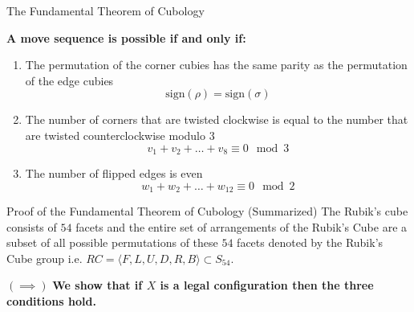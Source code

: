\documentclass[final]{beamer}
\newlength{\colwidth}
\begin{document}
\begin{frame}[t]
\begin{columns}[t]
\begin{column}{\colwidth}

  \begin{alertblock}{The Fundamental Theorem of Cubology}
    
    \textbf{A move sequence is possible if and only if:} 

    \begin{enumerate}
      \item The permutation of the corner cubies has the same parity as the permutation of the edge cubies 
      $$\text{sign}(\rho) = \text{sign}(\sigma)$$
      \item The number of corners that are twisted clockwise is equal to the number that are twisted counterclockwise modulo $3$
      $$v_{1} + v_{2} +\dots +v_{8} \equiv 0 \mod 3$$
      \item The number of flipped edges is even
      $$w_{1} + w_{2} +\dots +w_{12} \equiv 0 \mod 2$$
    \end{enumerate}


  \end{alertblock}

  \begin{block}{Proof of the Fundamental Theorem of Cubology (Summarized)}
    The Rubik's cube consists of $54$ facets and the entire set of arrangements of the Rubik's Cube are a subset of all possible permutations of these $54$ facets 
    denoted by the Rubik's Cube group i.e. $RC = \langle F,L,U,D,R,B\rangle \subset S_{54}$.



$(\implies)$ 
\textbf{We show that if $X$ is a legal configuration then the three conditions hold.}


\end{block}
\end{column}
\end{columns}
\end{frame}
\end{document}
